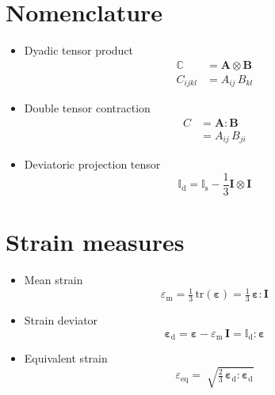 \documentclass[times,namecite]{goose-article}
\begin{document}
\appendix
\vfill\newpage

\section{Nomenclature}
\label{sec:nomenclature}

\begin{itemize}
%
\item Dyadic tensor product
\begin{align}
  \mathbb{C} &= \bm{A} \otimes \bm{B} \\
  C_{ijkl}   &= A_{ij} \,      B_{kl}
\end{align}
%
\item Double tensor contraction
\begin{align}
  C &= \bm{A} : \bm{B} \\
    &= A_{ij} \, B_{ji}
\end{align}
%
\item Deviatoric projection tensor
\begin{equation}
  \mathbb{I}_\mathrm{d}
  = \mathbb{I}_\mathrm{s} - \frac{1}{3} \bm{I} \otimes \bm{I}
\end{equation}
%
\end{itemize}

\section{Strain measures}
\label{sec:strain}

\begin{itemize}
%
\item Mean strain
\begin{equation}
  \varepsilon_\mathrm{m}
  = \tfrac{1}{3} \, \mathrm{tr} ( \bm{\varepsilon} )
  = \tfrac{1}{3} \, \bm{\varepsilon} : \bm{I}
\end{equation}
%
\item Strain deviator
\begin{equation}
  \bm{\varepsilon}_\mathrm{d}
  = \bm{\varepsilon} - \varepsilon_\mathrm{m} \, \bm{I}
  = \mathbb{I}_\mathrm{d} : \bm{\varepsilon}
\end{equation}
%
\item Equivalent strain
\begin{equation}
  \varepsilon_\mathrm{eq}
  = \; \sqrt{
    \tfrac{2}{3} \, \bm{\varepsilon}_\mathrm{d} : \bm{\varepsilon}_\mathrm{d}
  }
\end{equation}
%
\end{itemize}
\end{document}
